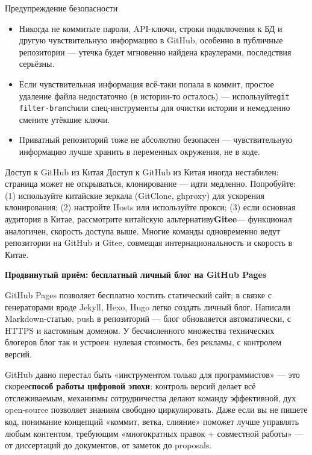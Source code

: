 \begin{tcbwarn}{Предупреждение безопасности}
\begin{itemize}
  \item Никогда не коммитьте пароли, API-ключи, строки подключения к БД и другую чувствительную информацию в GitHub, особенно в публичные репозитории — утечка будет мгновенно найдена краулерами, последствия серьёзны.
  \item Если чувствительная информация всё-таки попала в коммит, простое удаление файла недостаточно (в истории-то осталось) — используйте\texttt{git filter-\allowbreak branch}или спец-инструменты для очистки истории и немедленно смените утёкшие ключи.
  \item Приватный репозиторий тоже не абсолютно безопасен — чувствительную информацию лучше хранить в переменных окружения, не в коде.
\end{itemize}

\end{tcbwarn}

\begin{tcbinfo}{Доступ к GitHub из Китая}
Доступ к GitHub из Китая иногда нестабилен: страница может не открываться, клонирование — идти медленно. Попробуйте: (1) используйте китайские зеркала (GitClone, ghproxy) для ускорения клонирования; (2) настройте Hosts или используйте прокси; (3) если основная аудитория в Китае, рассмотрите китайскую альтернативу\textbf{Gitee}— функционал аналогичен, скорость доступа выше. Многие команды одновременно ведут репозитории на GitHub и Gitee, совмещая интернациональность и скорость в Китае.

\end{tcbinfo}

\textbf{Продвинутый приём: бесплатный личный блог на GitHub Pages}\par

GitHub Pages позволяет бесплатно хостить статический сайт; в связке с генераторами вроде Jekyll, Hexo, Hugo легко создать личный блог. Написали Markdown-статью, push в репозиторий — блог обновляется автоматически, с HTTPS и кастомным доменом. У бесчисленного множества технических блогеров блог так и устроен: нулевая стоимость, без рекламы, с контролем версий.


GitHub давно перестал быть «инструментом только для программистов» — это скорее\textbf{способ работы цифровой эпохи}: контроль версий делает всё отслеживаемым, механизмы сотрудничества делают команду эффективной, дух open-source позволяет знаниям свободно циркулировать. Даже если вы не пишете код, понимание концепций «коммит, ветка, слияние» поможет лучше управлять любым контентом, требующим «многократных правок + совместной работы» — от диссертаций до документов, от заметок до proposals.

